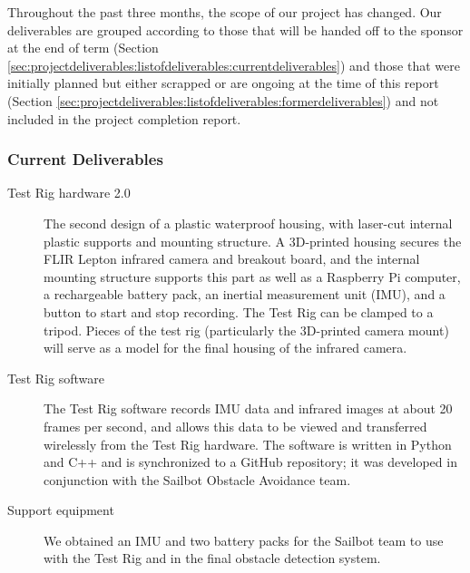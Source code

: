 
\iffalse
This is a direct follow-up from the details contained in the Project Proposal section. The list can describe the final state of each item in the list, any differences between the original deliverables and the actual deliverables, and in what form the Project Sponsor can expect to receive the Deliverable from the Team Members.
\fi

Throughout the past three months, the scope of our project has changed. Our deliverables are grouped according to those that will be handed off to the sponsor at the end of term (Section \ref{sec:projectdeliverables:listofdeliverables:currentdeliverables}) and those that were initially planned but either scrapped or are ongoing at the time of this report (Section \ref{sec:projectdeliverables:listofdeliverables:formerdeliverables}) and not included in the project completion report.

\subsubsection{\label{sec:projectdeliverables:listofdeliverables:currentdeliverables}Current Deliverables}

\begin{description}
\item[Test Rig hardware 2.0] The second design of a plastic waterproof housing, with laser-cut internal plastic supports and mounting structure. A 3D-printed housing secures the FLIR Lepton infrared camera and breakout board, and the internal mounting structure supports this part as well as a Raspberry Pi computer, a rechargeable battery pack, an inertial measurement unit (IMU), and a button to start and stop recording. The Test Rig can be clamped to a tripod. Pieces of the test rig (particularly the 3D-printed camera mount) will serve as a model for the final housing of the infrared camera.
\item[Test Rig software] The Test Rig software records IMU data and infrared images at about 20 frames per second, and allows this data to be viewed and transferred wirelessly from the Test Rig hardware. The software is written in Python and C++ and is synchronized to a GitHub repository; it was developed in conjunction with the Sailbot Obstacle Avoidance team.
\item[Support equipment] We obtained an IMU and two battery packs for the Sailbot team to use with the Test Rig and in the final obstacle detection system.
\end{description}

